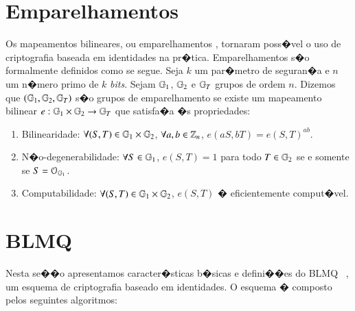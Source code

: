 \documentclass[a4paper,capchap,espacoduplo,normaltoc]{abntepusp}
\begin{document}
\section{Emparelhamentos}
Os mapeamentos bilineares, ou emparelhamentos \cite{sakai-ohgishi-kasahara,boneh-franklin}, tornaram poss�vel o uso de criptografia baseada em identidades na pr�tica. Emparelhamentos s�o formalmente definidos como se segue. Seja $k$ um par�metro de seguran�a e $n$ um n�mero primo de  $k$ \emph{bits}. Sejam $\mathbb{G}_1$, $\mathbb{G}_2$ e $\mathbb{G}_T$ grupos de ordem $n$. Dizemos que $(\mathbb{G}_1,\mathbb{G}_2,\mathbb{G}_T)$ s�o grupos de emparelhamento se existe um mapeamento bilinear $e: \mathbb{G}_1 \times \mathbb{G}_2 \rightarrow \mathbb{G}_T$ que satisfa�a �s propriedades:
\begin{enumerate}
\item Bilinearidade: $\forall (S,T) \in \mathbb{G}_1 \times \mathbb{G}_2$, $\forall a,b \in \mathbb{Z}_n$, $e(aS, bT) = e(S,T)^{ab}$.
\item N�o-degenerabilidade: $\forall S \in \mathbb{G}_1$, $e(S,T)=1$ para todo $T \in \mathbb{G}_2$ se e somente se $S=\mathcal{O}_{\mathbb{G}_1}$.
\item Computabilidade: $\forall (S,T) \in \mathbb{G}_1 \times \mathbb{G}_2$, $e(S,T)$ � eficientemente comput�vel.
\end{enumerate}

\section{BLMQ}
Nesta se��o apresentamos caracter�sticas b�sicas e defini��es do BLMQ ~\cite{barreto-libert-mccullagh-quisquater}, um esquema de criptografia baseado em identidades. O esquema � composto pelos seguintes algoritmos:
\end{document}
